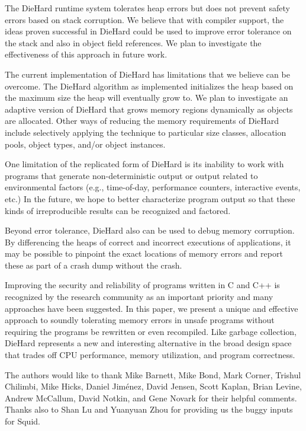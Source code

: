 \documentclass{sig-alternate}
\begin{document}
The DieHard runtime system tolerates heap errors but does not
prevent safety errors based on stack corruption.  We believe that with
compiler support, the ideas proven successful in DieHard could be used
to improve error tolerance on the stack and also in object field
references.  We plan to investigate the effectiveness of this approach
in future work.

The current implementation of DieHard has limitations that we believe
can be overcome.  The DieHard algorithm as implemented
initializes the heap based on the maximum size the heap will
eventually grow to.  We plan to investigate an adaptive version of
DieHard that grows memory regions dynamically as objects are
allocated. Other ways of reducing the memory requirements of DieHard
include selectively applying the technique to particular size classes,
allocation pools, object types, and/or object instances.

One limitation of the replicated form of DieHard is its inability to
work with programs that generate non-deterministic output or output
related to environmental factors (e.g., time-of-day, performance
counters, interactive events, etc.)  In the future, we hope to better
characterize program output so that these kinds of irreproducible
results can be recognized and factored.

Beyond error tolerance, DieHard also can be used to debug memory
corruption.  By differencing the heaps of correct and incorrect
executions of applications, it may be possible to pinpoint the exact
locations of memory errors and report these as part of a crash dump
without the crash.

Improving the security and reliability of programs written in C and
C++ is recognized by the research community as an important priority
and many approaches have been suggested.  In this paper, we present a
unique and effective approach to soundly tolerating memory errors in
unsafe programs without requiring the programs be rewritten or even
recompiled. Like garbage collection, DieHard represents a new and
interesting alternative in the broad design space that trades off CPU
performance, memory utilization, and program correctness.



\acks

\noindent
The authors would like to thank Mike Barnett, Mike Bond, Mark Corner,
Trishul Chilimbi, Mike Hicks, Daniel Jim\'enez, David Jensen, Scott
Kaplan, Brian Levine, Andrew McCallum, David Notkin, and Gene Novark
for their helpful comments. Thanks also to Shan Lu and Yuanyuan Zhou
for providing us the buggy inputs for Squid.
\end{document}
